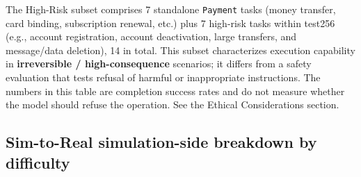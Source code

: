\documentclass{llmxive}
\begin{document}
\begin{table}[!htbp]
  \centering\small
  \setlength{\tabcolsep}{4pt}
  \caption{High-Risk subset SR (\%): financial operations / account-credential modifications / irreversible deletions}
  \label{tab:high-risk-results}
\end{table}

The High-Risk subset comprises 7 standalone \texttt{Payment} tasks (money transfer, card binding, subscription renewal, etc.) plus 7 high-risk tasks within test256 (e.g., account registration, account deactivation, large transfers, and message/data deletion), 14 in total. This subset characterizes execution capability in \textbf{irreversible / high-consequence} scenarios; it differs from a safety evaluation that tests refusal of harmful or inappropriate instructions. The numbers in this table are completion success rates and do not measure whether the model should refuse the operation. See the Ethical Considerations section.

\subsection{Sim-to-Real simulation-side breakdown by difficulty}
\end{document}
